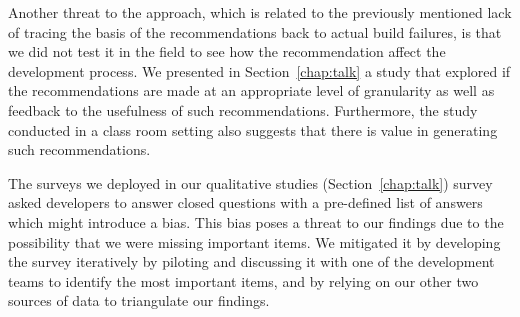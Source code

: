 
Another threat to the approach, which is related to the previously mentioned lack of tracing the basis of the recommendations back to actual build failures, is that we did not test it in the field to see how the recommendation affect the development process.
We presented in Section~\ref{chap:talk} a study that explored if the recommendations are made at an appropriate level of granularity as well as feedback to the usefulness of such recommendations.
Furthermore, the study conducted in a class room setting also suggests that there is value in generating such recommendations.

The surveys we deployed in our qualitative studies (Section~\ref{chap:talk}) survey asked developers to answer closed questions with a pre-defined list of answers which might introduce a bias.
This bias poses a threat to our findings due to the possibility that we were missing important items.
We mitigated it by developing the survey iteratively by piloting and discussing it with one of the development teams to identify the most important items, and by relying on our other two sources of data to triangulate our findings.











